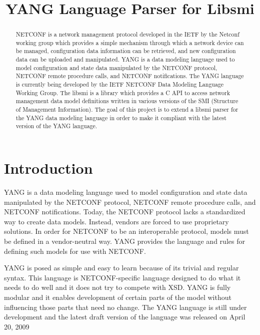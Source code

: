 \documentclass[conference]{IEEEtran}
\begin{document}
\title{YANG Language Parser for Libsmi}
\author{
}

\maketitle

\begin{abstract}
NETCONF is a network management protocol developed in the IETF by the Netconf working group  
which provides a simple mechanism through which a network device can be managed, configuration data information can be retrieved, and new configuration data can be uploaded and manipulated. YANG is a data modeling language used to model configuration and state data manipulated by the NETCONF protocol, NETCONF remote procedure calls, and NETCONF notifications. The YANG language is currently being developed by the IETF NETCONF Data Modeling Language Working Group. The libsmi is a library which provides a C API to access network management data model definitions written in various versions of the SMI (Structure of Management Information). The goal of this project is to extend a libsmi parser for the YANG data modeling language in order to make it compliant with the latest version of the YANG language.
\end{abstract}

\section{Introduction}
YANG is a data modeling language used to model configuration and state data manipulated by the NETCONF protocol, 
NETCONF remote procedure calls, and NETCONF notifications. Today, the NETCONF protocol \cite{bib1} lacks a standardized way to create data models. 
Instead, vendors are forced to use proprietary solutions. In order for NETCONF to be an interoperable protocol, models must be defined in a vendor-neutral way. 
YANG provides the language and rules for defining such models for use with NETCONF. 

YANG is posed as simple and easy to learn because of its trivial and regular syntax. 
This language is NETCONF-specific language designed to do what it needs to do well and it does not try to compete with XSD.
YANG is fully modular and it enables development of certain parts of the model without influencing those parts that need no change.
The YANG language is still under development and the latest draft version of the language was released on April 20, 2009 
\end{document}
